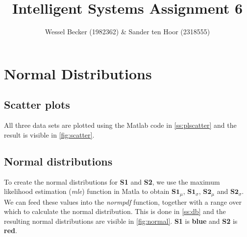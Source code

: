 \documentclass[10pt,a4paper]{article}
\begin{document}
\title{Intelligent Systems Assignment 6}
\author{Wessel Becker (1982362) \& Sander ten Hoor (2318555)}
\maketitle

\newcommand{\simplesubfigure}[3]{
  \noindent\begin{minipage}{.31\linewidth}
    \begin{center}
      \texttt{[image: \#1]}
      \captionof{figure}{#2}
      \label{#3}
    \end{center}
  \end{minipage}\hspace{7pt}
}
\newcommand{\simplefigure}[3]{
	\noindent\begin{figure}[H]
  	\centering
    	\makebox[.6\textwidth]
    	{
    		\texttt{[image: \#1]}
 		} \\
  		\caption{#2}
  		\label{#3}
	\end{figure}
}
\newcommand{\mcode}[2]{
	\label{#2}
}

\section{Normal Distributions}
\subsection{Scatter plots}
All three data sets are plotted using the Matlab code in \autoref{ss:plscatter} and the result is visible in \autoref{fig:scatter}.

\subsection{Normal distributions}
To create the normal distributions for \textbf{S1} and \textbf{S2}, we use the maximum likelihood estimation (\textit{mle}) function in Matla to obtain $\textbf{S1}_\mu$, $\textbf{S1}_\sigma$, $\textbf{S2}_\mu$ and $\textbf{S2}_\sigma$. We can feed these values into the \textit{normpdf} function, together with a range over which to calculate the normal distribution. This is done in \autoref{ss:db} and the resulting normal distributions are visible in \autoref{fig:normal}. \textbf{S1} is \textbf{blue} and \textbf{S2} is \textbf{red}.
\end{document}
